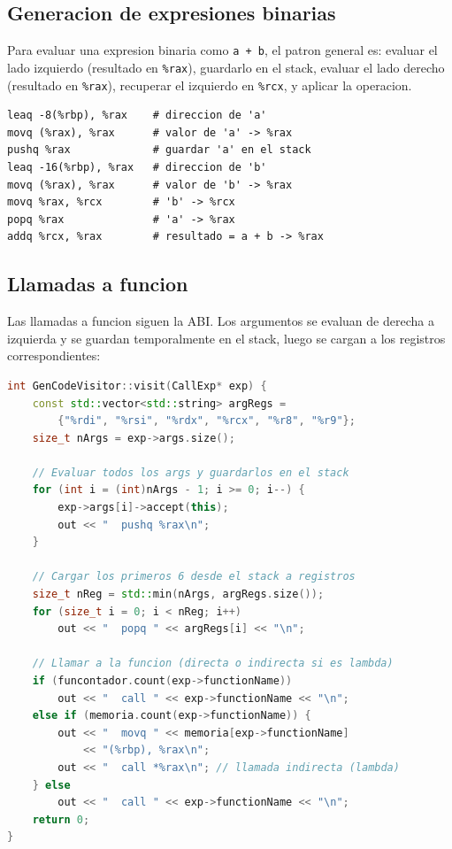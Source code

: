 \documentclass[12pt, a4paper]{article}
\begin{document}
\subsection{Generacion de expresiones binarias}

Para evaluar una expresion binaria como \texttt{a + b}, el patron general es: evaluar el lado izquierdo (resultado en \texttt{\%rax}), guardarlo en el stack, evaluar el lado derecho (resultado en \texttt{\%rax}), recuperar el izquierdo en \texttt{\%rcx}, y aplicar la operacion.

\begin{lstlisting}[style=asmstyle, caption={Ensamblador generado para "a + b"}]
leaq -8(%rbp), %rax    # direccion de 'a'
movq (%rax), %rax      # valor de 'a' -> %rax
pushq %rax             # guardar 'a' en el stack
leaq -16(%rbp), %rax   # direccion de 'b'
movq (%rax), %rax      # valor de 'b' -> %rax
movq %rax, %rcx        # 'b' -> %rcx
popq %rax              # 'a' -> %rax
addq %rcx, %rax        # resultado = a + b -> %rax
\end{lstlisting}

\subsection{Llamadas a funcion}

Las llamadas a funcion siguen la ABI. Los argumentos se evaluan de derecha a izquierda y se guardan temporalmente en el stack, luego se cargan a los registros correspondientes:

\begin{lstlisting}[language=C++, style=cppstyle, caption={Generacion de llamada a funcion}]
int GenCodeVisitor::visit(CallExp* exp) {
    const std::vector<std::string> argRegs =
        {"%rdi", "%rsi", "%rdx", "%rcx", "%r8", "%r9"};
    size_t nArgs = exp->args.size();

    // Evaluar todos los args y guardarlos en el stack
    for (int i = (int)nArgs - 1; i >= 0; i--) {
        exp->args[i]->accept(this);
        out << "  pushq %rax\n";
    }

    // Cargar los primeros 6 desde el stack a registros
    size_t nReg = std::min(nArgs, argRegs.size());
    for (size_t i = 0; i < nReg; i++)
        out << "  popq " << argRegs[i] << "\n";

    // Llamar a la funcion (directa o indirecta si es lambda)
    if (funcontador.count(exp->functionName))
        out << "  call " << exp->functionName << "\n";
    else if (memoria.count(exp->functionName)) {
        out << "  movq " << memoria[exp->functionName]
            << "(%rbp), %rax\n";
        out << "  call *%rax\n"; // llamada indirecta (lambda)
    } else
        out << "  call " << exp->functionName << "\n";
    return 0;
}
\end{lstlisting}
\end{document}

